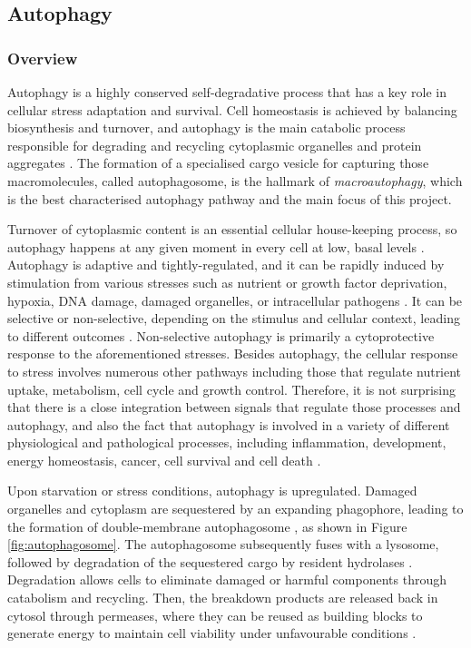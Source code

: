     
    
    
    
    
    
    
        
        
        
     \newpage   
    \subsection{Autophagy}
    
    \subsubsection{Overview}

    Autophagy is a highly conserved self-degradative process that has a key role in cellular stress adaptation and survival. Cell homeostasis is achieved by balancing biosynthesis and turnover, and autophagy is the main catabolic process responsible for degrading and recycling cytoplasmic organelles and protein aggregates \cite{Feng2015}. The formation of a specialised cargo vesicle for capturing those macromolecules, called autophagosome, is the hallmark of \textit{macroautophagy}, which is the best characterised autophagy pathway and the main focus of this project. 

    Turnover of cytoplasmic content is an essential cellular house-keeping process, so autophagy happens at any given moment in every cell at low, basal levels \cite{levine2008autophagy}. Autophagy is adaptive and tightly-regulated, and it can be rapidly induced by stimulation from various stresses such as nutrient or growth factor deprivation, hypoxia, DNA damage, damaged organelles, or intracellular pathogens \cite{Kroemer2010}. It can be selective or non-selective, depending on the stimulus and cellular context, leading to different outcomes \cite{Feng2015}. Non-selective autophagy is primarily a cytoprotective response to the aforementioned stresses. 
    Besides autophagy, the cellular response to stress involves numerous other pathways including those that regulate nutrient uptake, metabolism, cell cycle and growth control. Therefore, it is not surprising that there is a close integration between signals that regulate those processes and autophagy, and also the fact that autophagy is involved in a variety of different physiological and pathological processes, including inflammation, development, energy homeostasis, cancer, cell survival and cell death \cite{levine2008autophagy}.

    Upon starvation or stress conditions, autophagy is upregulated. Damaged organelles and cytoplasm are sequestered by an expanding phagophore, leading to the formation of double-membrane autophagosome \cite{Feng2015}, as shown in Figure \ref{fig:autophagosome}. The autophagosome subsequently fuses with a lysosome, followed by degradation of the sequestered cargo by resident hydrolases \cite{Yorimitsu2005Autophagy:Self-eating}. Degradation allows cells to eliminate damaged or harmful components through catabolism and recycling. Then, the breakdown products are released back in cytosol through permeases, where they can be reused as building blocks to generate energy to maintain cell viability under unfavourable conditions \cite{Feng2013TheMacroautophagy}. 


